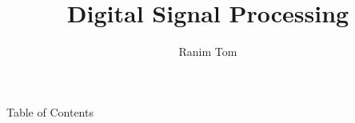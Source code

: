 \documentclass{beamer}
\title[Acronym]{Digital Signal Processing}
\author{Ranim Tom}
\date[]
\begin{document}

\begin{frame}
\titlepage
\end{frame}


\begin{frame}[t,allowframebreaks]{Table of Contents}
\tableofcontents
\end{frame}





































\end{document}
